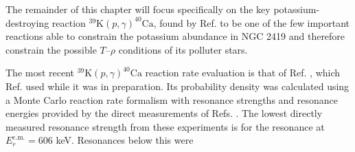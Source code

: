 The remainder of this chapter will focus specifically on the key potassium-destroying reaction $^{39}\mathrm{K}(p,\gamma)^{40}\mathrm{Ca}$, found by Ref. \cite{Dermigny2017} to be one of the few important reactions able to constrain the potassium abundance in NGC 2419 and therefore constrain the possible $T$--$\rho$ conditions of its polluter stars. 



The most recent $^{39}\mathrm{K}(p,\gamma)^{40}\mathrm{Ca}$ reaction rate evaluation is that of Ref. \cite{Longland2018}, which Ref. \cite{Dermigny2017} used while it was in preparation. Its probability density was calculated using a Monte Carlo reaction rate formalism \cite{Longland2010a} with resonance strengths and resonance energies provided by the direct measurements of Refs. \cite{Kikstra1990,Cheng1981,Leenhouts1966}. The lowest directly measured resonance strength from these experiments is for the resonance at $E^{\mathrm{c.m.}}_{r} = 606$ keV. Resonances below this were 


